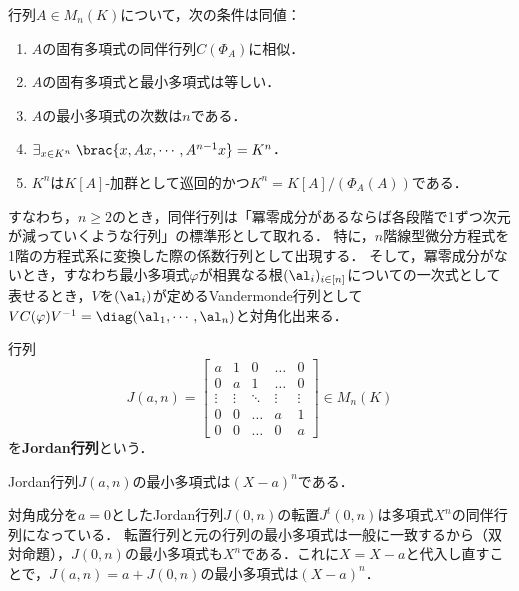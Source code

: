 \documentclass[uplatex, dvipdfmx]{jsreport}
\begin{document}
\begin{theorem}[同伴行列の特徴付け]
    行列$A\in M_n(K)$について，次の条件は同値：
    \begin{enumerate}
        \item $A$の固有多項式の同伴行列$C(\Phi_A)$に相似．
        \item $A$の固有多項式と最小多項式は等しい．
        \item $A$の最小多項式の次数は$n$である．
        \item $\exists_{x\in K^n}\;\brac{x,Ax,\cdots,A^{n-1}x}=K^n$．
        \item $K^n$は$K[A]$-加群として巡回的かつ$K^n=K[A]/(\Phi_A(A))$である．
    \end{enumerate}
\end{theorem}
\begin{remarks}\label{remarks-companion-matrix-and-vandermonde-matrix}
    すなわち，$n\ge2$のとき，同伴行列は「冪零成分があるならば各段階で1ずつ次元が減っていくような行列」の標準形として取れる．
    特に，$n$階線型微分方程式を1階の方程式系に変換した際の係数行列として出現する．
    そして，冪零成分がないとき，すなわち最小多項式$\varphi$が相異なる根$(\al_i)_{i\in[n]}$についての一次式として表せるとき，$V$を$(\al_i)$が定めるVandermonde行列として$VC(\varphi)V^{-1}=\diag(\al_1,\cdots,\al_n)$と対角化出来る．
\end{remarks}

\begin{definition}
        行列
        \[J(a,n)=\begin{bmatrix}
        a & 1 & 0 & \dots & 0 \\
        0 & a & 1 & \dots & 0 \\
        \vdots & \vdots & \ddots & \vdots & \vdots \\
        0 & 0 & \dots & a & 1 \\
        0 & 0 & \dots & 0 & a
        \end{bmatrix}\in M_n(K)\]
    を\textbf{Jordan行列}という．
\end{definition}

\begin{corollary}
    Jordan行列$J(a,n)$の最小多項式は$(X-a)^n$である．
\end{corollary}
\begin{Proof}
    対角成分を$a=0$としたJordan行列$J(0,n)$の転置$J^t(0,n)$は多項式$X^n$の同伴行列になっている．
    転置行列と元の行列の最小多項式は一般に一致するから（双対命題），$J(0,n)$の最小多項式も$X^n$である．これに$X=X-a$と代入し直すことで，$J(a,n)=a+J(0,n)$の最小多項式は$(X-a)^n$．
\end{Proof}
\end{document}
